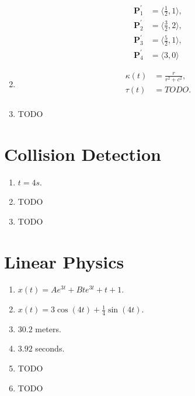 \documentclass[a4paper]{report}
\begin{document}
\begin{enumerate}
\begin{align*}
			\mathbf{P}_1^{\prime} &= \langle \frac{1}{2}, 1 \rangle,\\
			\mathbf{P}_2^{\prime} &= \langle \frac{3}{2}, 2 \rangle,\\
			\mathbf{P}_3^{\prime} &= \langle \frac{5}{2}, 1 \rangle,\\
			\mathbf{P}_4^{\prime} &= \langle 3, 0 \rangle
		\end{align*}
	\item
		\begin{align*}
			\kappa(t) &= \frac{r}{r^2 + c^2},\\
			\tau(t) &= TODO.\\
		\end{align*}
	\item TODO
\end{enumerate}

\chapter{Collision Detection}
\begin{enumerate}
	\item $t = 4s$.
	\item TODO
	\item TODO
\end{enumerate}

\chapter{Linear Physics}
\begin{enumerate}
	\item $x(t) = Ae^{3t} + Bte^{3t} + t + 1$.
	\item $x(t) = 3\cos(4t) + \frac{1}{4}\sin(4t)$.
	\item $30.2$ meters.
	\item $3.92$ seconds.
	\item TODO
	\item TODO
\end{enumerate}
\end{document}
